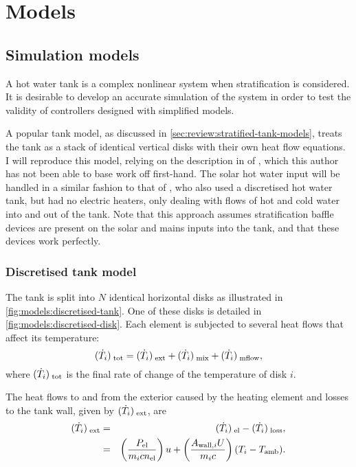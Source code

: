 \chapter{Models}
\label{chap:models}

\section{Simulation models}

A hot water tank is a complex nonlinear system when stratification is considered.
It is desirable to develop an accurate simulation of the system in order to test the validity of controllers designed with simplified models.

A popular tank model, as discussed in \autoref{sec:review:stratified-tank-models}, treats the tank as a stack of identical vertical disks with their own heat flow equations.
I will reproduce this model, relying on the description in \textcite{Pfeiffer11} of \textcite{Koch11}, which this author has not been able to base work off first-hand.
The solar hot water input will be handled in a similar fashion to that of \textcite{Cristofari02}, who also used a discretised hot water tank, but had no electric heaters, only dealing with flows of hot and cold water into and out of the tank.
Note that this approach assumes stratification baffle devices are present on the solar and mains inputs into the tank, and that these devices work perfectly.

\subsection{Discretised tank model}

The tank is split into $N$ identical horizontal disks as illustrated in \autoref{fig:models:discretised-tank}.
One of these disks is detailed in \autoref{fig:models:discretised-disk}.
Each element is subjected to several heat flows that affect its temperature:
\begin{equation}
   \label{eq:flow-total}
   (\dot{T}_{i})_{\;\text{tot}} = (\dot{T}_{i})_{\;\text{ext}} + (\dot{T}_{i})_{\;\text{mix}} + (\dot{T}_{i})_{\;\text{mflow}},
\end{equation}
where $(\dot{T}_{i})_{\;\text{tot}}$ is the final rate of change of the temperature of disk $i$.

The heat flows to and from the exterior caused by the heating element and losses to the tank wall, given by $(\dot{T}_{i})_{\;\text{ext}}$, are
\begin{eqnarray}
   \label{eq:flow-ext}
   (\dot{T}_{i})_{\;\text{ext}} &=& (\dot{T}_{i})_{\;\text{el}} - (\dot{T}_{i})_{\;\text{loss}}, \nonumber\\
              &=& \left(\frac{P_{\text{el}}}{m_i c n_{\text{el}}}\right) u
                + \left(\frac{A_{\text{wall}, i} U}{m_i c}\right) (T_i - T_{\text{amb}}).
\end{eqnarray}

